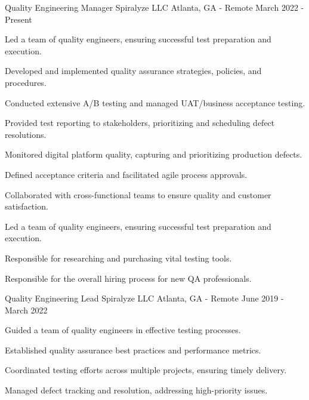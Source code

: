 

\begin{cventries}

  \cventry
    {Quality Engineering Manager} %
    {Spiralyze LLC} %
    {Atlanta, GA - Remote} %
    {March 2022 - Present} %
    {
      \begin{cvitems} %
        \item {Led a team of quality engineers, ensuring successful test preparation and execution.}
        \item {Developed and implemented quality assurance strategies, policies, and procedures.}
        \item {Conducted extensive A/B testing and managed UAT/business acceptance testing.}
        \item {Provided test reporting to stakeholders, prioritizing and scheduling defect resolutions.}
        \item {Monitored digital platform quality, capturing and prioritizing production defects.}
        \item {Defined acceptance criteria and facilitated agile process approvals.}
        \item {Collaborated with cross-functional teams to ensure quality and customer satisfaction.}
        \item {Led a team of quality engineers, ensuring successful test preparation and execution.}
        \item {Responsible for researching and purchasing vital testing tools.}
        \item {Responsible for the overall hiring process for new QA professionals.}
      \end{cvitems}
    }

  \cventry
    {Quality Engineering Lead} %
    {Spiralyze LLC} %
    {Atlanta, GA - Remote} %
    {June 2019 - March 2022} %
    {
      \begin{cvitems} %
        \item {Guided a team of quality engineers in effective testing processes.}
        \item {Established quality assurance best practices and performance metrics.}
        \item {Coordinated testing efforts across multiple projects, ensuring timely delivery.}
        \item {Managed defect tracking and resolution, addressing high-priority issues.}
      \end{cvitems}
    }


\end{cventries}
